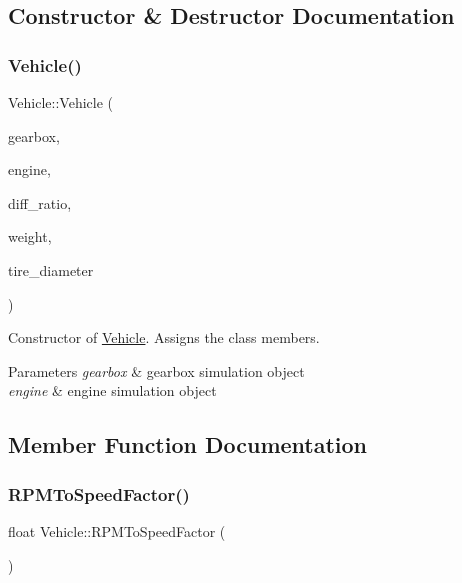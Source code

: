 \subsection{Constructor \& Destructor Documentation}
\mbox{\label{classVehicle_a545cb4416e5aa5c15311964a3de033fb}} 
\subsubsection{\texorpdfstring{Vehicle()}{Vehicle()}}
{\footnotesize\ttfamily Vehicle\+::\+Vehicle (\begin{DoxyParamCaption}\item[{\hyperlink{classGearbox}{Gearbox} $\ast$}]{gearbox,  }\item[{\hyperlink{classEngine}{Engine} $\ast$}]{engine,  }\item[{const float \&}]{diff\+\_\+ratio,  }\item[{const uint16\+\_\+t \&}]{weight,  }\item[{const float \&}]{tire\+\_\+diameter }\end{DoxyParamCaption})}

Constructor of \hyperlink{classVehicle}{Vehicle}. Assigns the class members. 
\begin{DoxyParams}{Parameters}
{\em gearbox} & gearbox simulation object \\
\hline
{\em engine} & engine simulation object \\
\hline
\end{DoxyParams}


\subsection{Member Function Documentation}
\mbox{\label{classVehicle_a52a12c60b5a8885dc9f95643c84958a8}} 
\subsubsection{\texorpdfstring{R\+P\+M\+To\+Speed\+Factor()}{RPMToSpeedFactor()}}
{\footnotesize\ttfamily float Vehicle\+::\+R\+P\+M\+To\+Speed\+Factor (\begin{DoxyParamCaption}{ }\end{DoxyParamCaption})}

